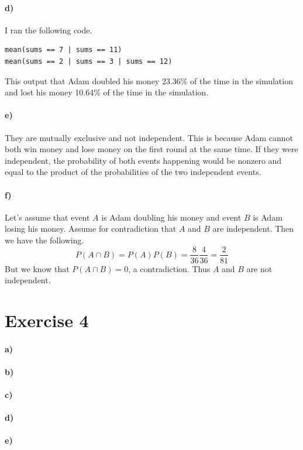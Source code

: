 \documentclass[12pt]{article}
\begin{document}
\paragraph{d)}

I ran the following code.
\begin{verbatim}
mean(sums == 7 | sums == 11)
mean(sums == 2 | sums == 3 | sums == 12)
\end{verbatim}
This output that Adam doubled his money 23.36\% of the time in the simulation and lost
his money 10.64\% of the time in the simulation.

\paragraph{e)}

They are mutually exclusive and not independent. This is because Adam cannot
both win money and lose money on the first round at the same time. If they
were independent, the probability of both events happening would be nonzero and
equal to the product of the probabilities of the two independent events.

\paragraph{f)}

Let's assume that event \(A\) is Adam doubling his money and event \(B\) is
Adam losing his money. Assume for contradiction that \(A\) and \(B\) are independent.
Then we have the following.
\[P(A\cap B)=P(A)P(B)=\frac{8}{36}\frac{4}{36}=\frac{2}{81}\]
But we know that \(P(A\cap B)=0\), a contradiction. Thus \(A\) and \(B\) are not
independent.

\section*{Exercise 4}

\paragraph{a)}

\paragraph{b)}

\paragraph{c)}

\paragraph{d)}

\paragraph{e)}
\end{document}
